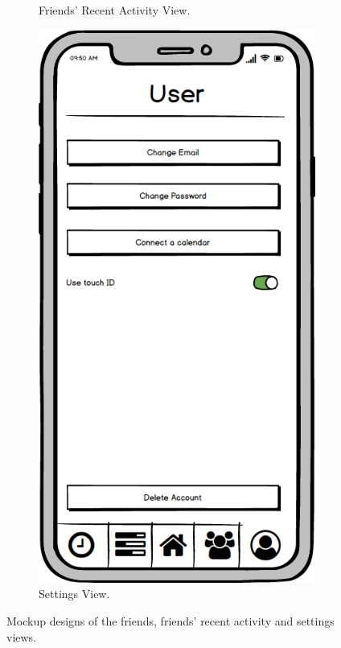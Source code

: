 \begin{figure}
\begin{subfigure}[b]{0.3\textwidth}
        \caption{Friends' Recent Activity View.}
        \label{fig:friends_recent}
    \end{subfigure}
    \hfill
    \begin{subfigure}[b]{0.3\textwidth}
        \centering
        \includegraphics[width=\textwidth]{./graphics/design/User Account.png}
        \caption{Settings View.}
        \label{fig:settings}
    \end{subfigure}
    
    \caption{Mockup designs of the friends, friends' recent activity and settings views.}
    \label{fig:friends_friendsrecent_settings}
\end{figure}

